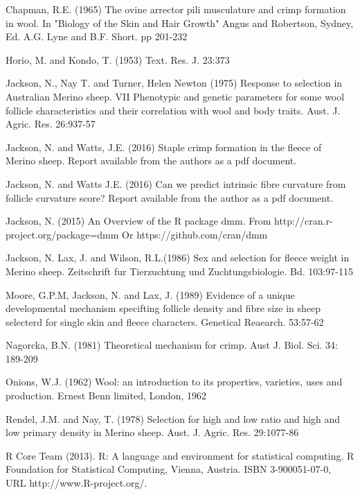 \documentclass[titlepage]{article}  %
\begin{document}
\begin{thebibliography}{99}

Chapman, R.E. (1965) The ovine arrector pili musculature and crimp formation 
    in wool. In "Biology of the Skin and Hair Growth" Angus and Robertson,
    Sydney, Ed. A.G. Lyne and B.F. Short. pp 201-232

Horio, M. and Kondo, T. (1953) Text. Res. J. 23:373

Jackson, N., Nay T. and Turner, Helen Newton (1975) Response to selection
    in Australian Merino sheep. VII Phenotypic and genetic parameters for
    some wool follicle characteristics and their correlation with wool and
    body traits. Aust. J. Agric. Res. 26:937-57

Jackson, N. and Watts, J.E. (2016) Staple crimp formation in the fleece of Merino sheep. 
Report available from the authors as a pdf document.

Jackson, N.  and Watts J.E. (2016) Can we predict intrinsic fibre curvature from follicle curvature score? Report available from the author as a pdf document.

Jackson, N. (2015) An Overview of the R package dmm.
    From http://cran.r-project.org/package=dmm
    Or https://github.com/cran/dmm

Jackson, N. Lax, J. and Wilson, R.L.(1986) Sex and selection for fleece weight in Merino sheep. Zeitschrift fur Tierzuchtung und Zuchtungsbiologie. Bd. 103:97-115

Moore, G.P.M, Jackson, N. and Lax, J. (1989) Evidence of a unique developmental mechanism specifting follicle density and fibre size in sheep selecterd for single skin and fleece characters. Genetical Reaearch. 53:57-62

Nagorcka, B.N. (1981) Theoretical mechanism for crimp.
     Aust J. Biol. Sci. 34: 189-209

Onions, W.J. (1962) Wool: an introduction to its properties, varieties, uses
     and production. Ernest Benn limited, London, 1962

Rendel, J.M. and Nay, T. (1978) Selection for high and low ratio and high 
    and low primary density in Merino sheep. 
    Aust. J. Agric. Res. 29:1077-86

R Core Team (2013). R: A language and environment for statistical
  computing. R Foundation for Statistical Computing, Vienna, Austria.
  ISBN 3-900051-07-0, URL http://www.R-project.org/.


\end{thebibliography}
\end{document}
